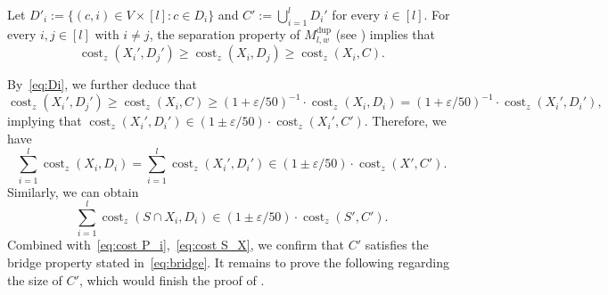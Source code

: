 \documentclass[letterpaper,11pt]{article}
\theoremstyle{plain}
\theoremstyle{definition}
\theoremstyle{remark}
\DeclareMathOperator{\cost}{cost}
\newcommand{\dup}{\mathrm{dup}}
\newcommand{\eps}{\varepsilon}
\begin{document}
Let $D'_i:=\{(c,i)\in V\times [l]:c\in D_i\}$ and $C':=\bigcup_{i=1}^l D_i'$ for every $i\in[l]$. For every $i,j\in [l]$ with $i\neq j$, the separation property of $M^\dup_{l,w}$ (see ) implies that 
\begin{equation*}
\cost_z(X_i',D_j')\ge \cost_z(X_i,D_j)\ge \cost_z(X_i,C).
\end{equation*}






By~\eqref{eq:Di}, we further deduce that 
\begin{equation*}
\cost_z(X_i',D_j')\ge \cost_z(X_i,C)\ge (1+\eps/50)^{-1}\cdot \cost_z(X_i,D_i)= (1+\eps/50)^{-1}\cdot \cost_z(X_i',D_i'),
\end{equation*}
implying that $\cost_z(X_i',D_i')\in (1\pm\eps/50)\cdot \cost_z(X_i',C')$.
Therefore, we have 
\begin{equation*}
\sum_{i=1}^l\cost_z(X_i,D_i) = \sum_{i=1}^l\cost_z(X_i',D_i') \in (1\pm \eps/50)\cdot\cost_z(X',C').
\end{equation*}
Similarly, we can obtain 
\begin{equation*}
\sum_{i=1}^l\cost_z(S\cap X_i,D_i)\in (1\pm\eps/50)\cdot \cost_z(S',C').
\end{equation*}
Combined with~\eqref{eq:cost P_i},~\eqref{eq:cost S_X}, we confirm that $C'$ satisfies the bridge property stated in~\eqref{eq:bridge}. It remains to prove the following  regarding the size of $C'$, which would finish the proof of .
\end{document}
